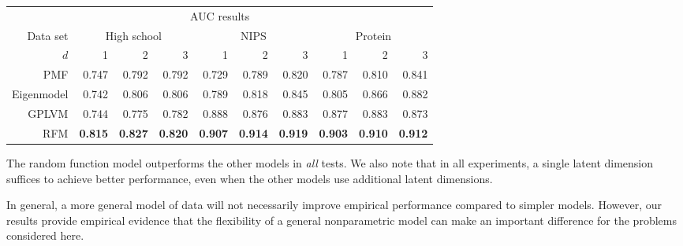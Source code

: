 \begin{center}
  \begin{tabular}{r | r r r | r r r | r r r}
    \multicolumn{10}{c}{AUC results} \\
    \addlinespace[2pt]
    Data set & \multicolumn{3}{c|}{High school} & \multicolumn{3}{c|}{NIPS} & \multicolumn{3}{c}{Protein} \\
    $d$\footnotemark & 1 & 2 & 3 & 1 & 2 & 3 & 1 & 2 & 3 \\
    \midrule
    PMF                   & 0.747 & 0.792 & 0.792 & 0.729 & 0.789 & 0.820 & 0.787 & 0.810 & 0.841 \\
    Eigenmodel            & 0.742 & 0.806 & 0.806 & 0.789 & 0.818 & 0.845 & 0.805 & 0.866 & 0.882 \\
    GPLVM                 & 0.744 & 0.775 & 0.782 & 0.888 & 0.876 & 0.883 & 0.877 & 0.883 & 0.873 \\
    RFM & \textbf{0.815} & \textbf{0.827} & \textbf{0.820} & \textbf{0.907} & \textbf{0.914} & \textbf{0.919} & \textbf{0.903} & \textbf{0.910} & \textbf{0.912}
  \end{tabular}
\end{center}


The random function model outperforms the other models in \emph{all} tests.
We also note that in all experiments, a single latent dimension suffices to achieve better performance, even when the other models use additional latent dimensions.

In general, a more general model of data will not necessarily improve empirical performance compared to simpler models.
However, our results provide empirical evidence that the flexibility of a general nonparametric model can make an important difference for the problems considered here.

